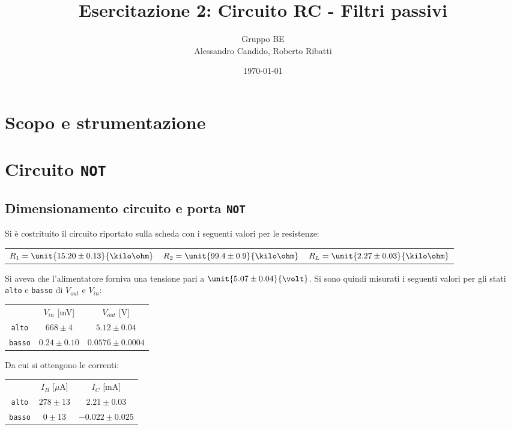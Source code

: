 \documentclass[10pt,a4paper]{article}
\title{Esercitazione 2: Circuito RC - Filtri passivi}
\author{Gruppo BE \\ Alessandro Candido, Roberto Ribatti}
\date{\today}
\def\code#1{\texttt{#1}}
\begin{document}
\maketitle

\section{Scopo e strumentazione}

\section{Circuito \code{NOT}}

\subsection{Dimensionamento circuito e porta \code{NOT}}
Si è costrituito il circuito riportato sulla scheda con i seguenti valori per le resistenze:

\begin{table}[h!]
\centering
\begin{tabular}{c|c|c}
$R_1 = \unit{15.20 \pm 0.13}{\kilo\ohm}$ & $R_2 = \unit{99.4 \pm 0.9}{\kilo\ohm}$ & $R_L = \unit{2.27 \pm 0.03}{\kilo\ohm}$
\end{tabular}
\end{table}

Si aveva che l'alimentatore forniva una tensione pari a $\unit{5.07 \pm 0.04}{\volt}$.
Si sono quindi misurati i seguenti valori per gli stati \code{alto} e \code{basso} di $V_{out}$ e $V_{in}$:

\begin{table}[h!]
\centering
\begin{tabular}{c|c|c}
 & $V_{in}$ [mV]& $V_{out}$ [V]\\
\code{alto} & $668 \pm 4$ & $5.12 \pm 0.04$\\
\code{basso} & $0.24 \pm 0.10$ & $0.0576 \pm 0.0004$
\end{tabular}
\end{table}

Da cui si ottengono le correnti:

\begin{table}[h!]
\centering
\begin{tabular}{c|c|c}
 & $I_B$ [$\mu$A]& $I_C$ [mA]\\
\code{alto} & $278 \pm 13$ & $2.21 \pm 0.03$\\
\code{basso} & $0 \pm 13 $ & $-0.022 \pm 0.025$
\end{tabular}
\end{table}
\end{document}
